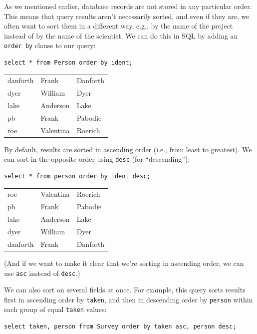 \documentclass{book}
\begin{document}
As we mentioned earlier, database records are not stored in any
particular order. This means that query results aren't necessarily
sorted, and even if they are, we often want to sort them in a different
way, e.g., by the name of the project instead of by the name of the
scientist. We can do this in SQL by adding an \texttt{order by} clause
to our query:

\begin{verbatim}
select * from Person order by ident;
\end{verbatim}

\begin{tabular}{lll}
danforth & Frank & Danforth \\
dyer & William & Dyer \\
lake & Anderson & Lake \\
pb & Frank & Pabodie \\
roe & Valentina & Roerich \\
\end{tabular}

By default, results are sorted in ascending order (i.e., from least to
greatest). We can sort in the opposite order using \texttt{desc} (for
``descending''):

\begin{verbatim}
select * from person order by ident desc;
\end{verbatim}

\begin{tabular}{lll}
roe & Valentina & Roerich \\
pb & Frank & Pabodie \\
lake & Anderson & Lake \\
dyer & William & Dyer \\
danforth & Frank & Danforth \\
\end{tabular}

(And if we want to make it clear that we're sorting in ascending order,
we can use \texttt{asc} instead of \texttt{desc}.)

We can also sort on several fields at once. For example, this query
sorts results first in ascending order by \texttt{taken}, and then in
descending order by \texttt{person} within each group of equal
\texttt{taken} values:

\begin{verbatim}
select taken, person from Survey order by taken asc, person desc;
\end{verbatim}
\end{document}
